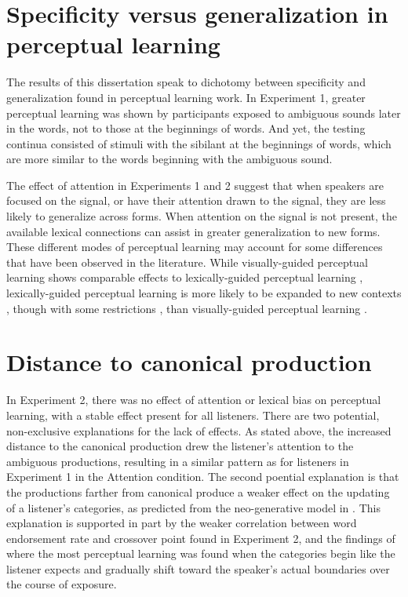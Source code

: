 \section{Specificity versus generalization in perceptual learning}

The results of this dissertation speak to dichotomy between specificity and generalization found in perceptual learning work. 
In Experiment 1, greater perceptual learning was shown by participants exposed to ambiguous sounds later in the words, not to those at the beginnings of words. 
And yet, the testing continua consisted of stimuli with the sibilant at the beginnings of words, which are more similar to the words beginning with the ambiguous sound.

The effect of attention in Experiments 1 and 2 suggest that when speakers are focused on the signal, or have their attention drawn to the signal, they are less likely to generalize across forms.
When attention on the signal is not present, the available lexical connections can assist in greater generalization to new forms.
These different modes of perceptual learning may account for some differences that have been observed in the literature.
While visually-guided perceptual learning shows comparable effects to lexically-guided perceptual learning \citep{vanLinden2007}, lexically-guided perceptual learning is more likely to be expanded to new contexts \citep{Norris2003, Kraljic2008a}, though with some restrictions \citep{Mitterer2013}, than visually-guided perceptual learning \citep{Reinisch2014}.

\section{Distance to canonical production}

In Experiment 2, there was no effect of attention or lexical bias on perceptual learning, with a stable effect present for all listeners.
There are two potential, non-exclusive explanations for the lack of effects.
As stated above, the increased distance to the canonical production drew the listener's attention to the ambiguous productions, resulting in a similar pattern as for listeners in Experiment 1 in the Attention condition.
The second poential explanation is that the productions farther from canonical produce a weaker effect on the updating of a listener's categories, as predicted from the neo-generative model in \citep{Pierrehumbert2002}.
This explanation is supported in part by the weaker correlation between word endorsement rate and crossover point found in Experiment 2, and the findings of \citet{Sumner2011} where the most perceptual learning was found when the categories begin like the listener expects and gradually shift toward the speaker's actual boundaries over the course of exposure.

